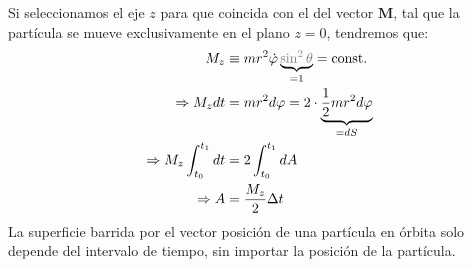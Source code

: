 \documentclass[]{article}
\numberwithin{equation}{section}
\begin{document}
Si seleccionamos el eje \(z\) para que coincida con el del vector \(\mathbf{M}\), tal que la partícula se mueve exclusivamente en el plano \(z = 0\), tendremos que:
\begin{align}
	M_z &\equiv m r^2 \dot{\varphi} \underbrace{\textcolor{gray}{ \sin^2\theta}}_{=1} = \mathrm{const.}\nonumber\\
	\Rightarrow M_z dt &= m r^2 d\varphi = 2 \cdot \underbrace{\frac{1}{2} m r^2 d\varphi}_{=dS}\nonumber\\
	\Rightarrow M_z \int_{t_0}^{t_1} dt&= 2 \int_{t_0}^{t_1} dA\nonumber\\
	\Rightarrow A &= \frac{M_z}{2}\Delta t \label{2da_Kepler}
\end{align}
La superficie barrida por el vector posición de una partícula en órbita solo depende del intervalo de tiempo, sin importar la posición de la partícula.
\end{document}
